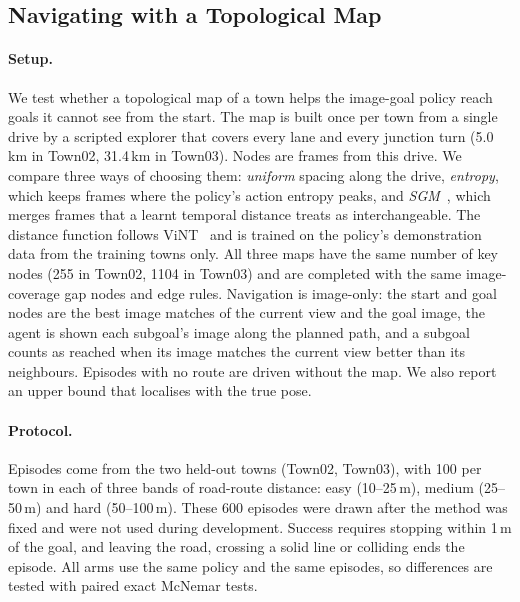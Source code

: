 \subsection{Navigating with a Topological Map}
\label{sec:map_navigation}

\paragraph{Setup.}
We test whether a topological map of a town helps the image-goal policy reach
goals it cannot see from the start. The map is built once per town from a single
drive by a scripted explorer that covers every lane and every junction turn
(5.0\,km in Town02, 31.4\,km in Town03). Nodes are frames from this drive. We
compare three ways of choosing them: \emph{uniform} spacing along the drive,
\emph{entropy}, which keeps frames where the policy's action entropy peaks, and
\emph{SGM}~\cite{emmons2020sgm}, which merges frames that a learnt temporal
distance treats as interchangeable. The distance function follows
ViNT~\cite{shah2023vint} and is trained on the policy's demonstration data from
the training towns only. All three maps have the same number of key nodes
(255 in Town02, 1104 in Town03) and are completed with the same image-coverage
gap nodes and edge rules. Navigation is
image-only: the start and goal nodes are the best image matches of the current
view and the goal image, the agent is shown each subgoal's image along the
planned path, and a subgoal counts as reached when its image matches the current
view better than its neighbours. Episodes with no route are driven without the
map. We also report an upper bound that localises with the true pose.

\paragraph{Protocol.}
Episodes come from the two held-out towns (Town02, Town03), with 100 per town in
each of three bands of road-route distance: easy (10--25\,m), medium
(25--50\,m) and hard (50--100\,m). These 600 episodes were drawn after the
method was fixed and were not used during development. Success requires
stopping within 1\,m of the goal, and leaving the road, crossing a solid line or
colliding ends the episode. All arms use the same policy and the same episodes,
so differences are tested with paired exact McNemar tests.

